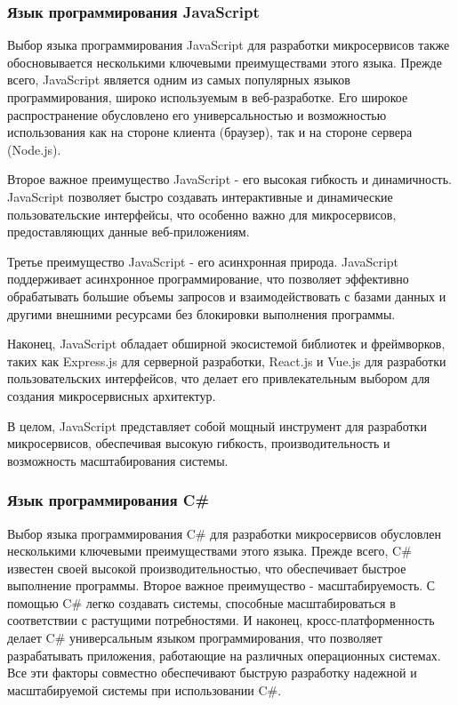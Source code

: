 \subsubsection{Язык программирования JavaScript}

Выбор языка программирования JavaScript для разработки микросервисов также обосновывается несколькими ключевыми преимуществами этого языка. Прежде всего, JavaScript является одним из самых популярных языков программирования, широко используемым в веб-разработке. Его широкое распространение обусловлено его универсальностью и возможностью использования как на стороне клиента (браузер), так и на стороне сервера (Node.js).

Второе важное преимущество JavaScript - его высокая гибкость и динамичность. JavaScript позволяет быстро создавать интерактивные и динамические пользовательские интерфейсы, что особенно важно для микросервисов, предоставляющих данные веб-приложениям.

Третье преимущество JavaScript - его асинхронная природа. JavaScript поддерживает асинхронное программирование, что позволяет эффективно обрабатывать большие объемы запросов и взаимодействовать с базами данных и другими внешними ресурсами без блокировки выполнения программы.

Наконец, JavaScript обладает обширной экосистемой библиотек и фреймворков, таких как Express.js для серверной разработки, React.js и Vue.js для разработки пользовательских интерфейсов, что делает его привлекательным выбором для создания микросервисных архитектур.

В целом, JavaScript представляет собой мощный инструмент для разработки микросервисов, обеспечивая высокую гибкость, производительность и возможность масштабирования системы.

\subsubsection{Язык программирования C\#}

Выбор языка программирования C\# для разработки микросервисов обусловлен несколькими ключевыми преимуществами этого языка. Прежде всего, C\# известен своей высокой производительностью, что обеспечивает быстрое выполнение программы. Второе важное преимущество - масштабируемость. С помощью C\# легко создавать системы, способные масштабироваться в соответствии с растущими потребностями. И наконец, кросс-платформенность делает C\# универсальным языком программирования, что позволяет разрабатывать приложения, работающие на различных операционных системах. Все эти факторы совместно обеспечивают быструю разработку надежной и масштабируемой системы при использовании C\#.

